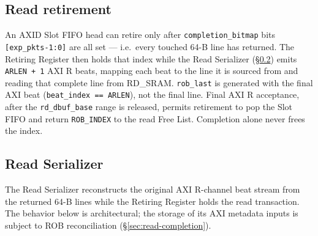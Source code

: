 \subsection{Read retirement}

An AXID Slot FIFO head can retire only after \texttt{completion\_bitmap}
bits \texttt{[exp\_pkts-1:0]} are all set --- i.e.\ every touched 64-B line
has returned.  The Retiring Register then holds that index while the Read
Serializer (\S\ref{sec:read-serializer}) emits \texttt{ARLEN + 1} AXI R
beats, mapping each beat to the line it is sourced from and reading that
complete line from RD\_SRAM.  \texttt{rob\_last} is generated with the final
AXI beat (\texttt{beat\_index == ARLEN}), not the final line.  Final AXI R
acceptance, after the \texttt{rd\_dbuf\_base} range is released, permits
retirement to pop the Slot FIFO and return \texttt{ROB\_INDEX} to the read
Free List.  Completion alone never frees the index.

\subsection{Read Serializer}
\label{sec:read-serializer}

The Read Serializer reconstructs the original AXI R-channel beat stream from
the returned 64-B lines while the Retiring Register holds the read
transaction.  The behavior below is architectural; the storage of its AXI
metadata inputs is subject to ROB reconciliation (\S\ref{sec:read-completion}).

